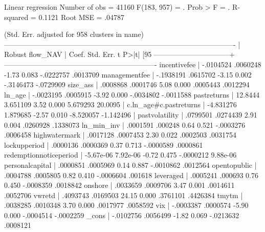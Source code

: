 Linear regression                                      Number of obs =   41160
                                                       F(183,   957) =       .
                                                       Prob > F      =       .
                                                       R-squared     =  0.1121
                                                       Root MSE      =  .04787

                                                    (Std. Err. adjusted for 958 clusters in name)
-------------------------------------------------------------------------------------------------
                          |               Robust
                 flow_NAV |      Coef.   Std. Err.      t    P>|t|     [95%
--------------------------------+----------------------------------------------------------------
             incentivefee |  -.0104524   .0060248    -1.73   0.083    -.0222757    .0013709
            managementfee |  -.1938191   .0615702    -3.15   0.002    -.3146473   -.0729909
                 size_ass |   .0008868   .0001746     5.08   0.000     .0005443    .0012294
                   ln_age |  -.0023195   .0005915    -3.92   0.000    -.0034802   -.0011588
              pastreturns |    12.8444   3.651109     3.52   0.000     5.679293     20.0095
                          |
   c.ln_age#c.pastreturns |  -4.831276   1.879685    -2.57   0.010    -8.520057   -1.142496
                          |
           pastvolatility |   .0799501   .0274439     2.91   0.004     .0260928    .1338073
               ln_min_inv |   .0001591    .000248     0.64   0.521    -.0003276    .0006458
            highwatermark |   .0017128   .0007453     2.30   0.022     .0002503    .0031754
             lockupperiod |   .0000136   .0000369     0.37   0.713    -.0000589    .0000861
   redemptionnoticeperiod |  -5.67e-06   7.92e-06    -0.72   0.475    -.0000212    9.88e-06
          personalcapital |   .0000851   .0005969     0.14   0.887    -.0010862    .0012564
             opentopublic |   .0004788   .0005805     0.82   0.410    -.0006604     .001618
                leveraged |   .0005241    .000693     0.76   0.450    -.0008359    .0018842
                  onshore |   .0033659   .0009706     3.47   0.001     .0014611    .0052706
                   vwretd |   .4093743   .0169503    24.15   0.000     .3761101    .4426384
                    tmytm |   .0038285   .0010348     3.70   0.000     .0017977    .0058592
                      vix |  -.0003387   .0000574    -5.90   0.000    -.0004514   -.0002259
                    _cons |  -.0102756   .0056499    -1.82   0.069    -.0213632    .0008121
